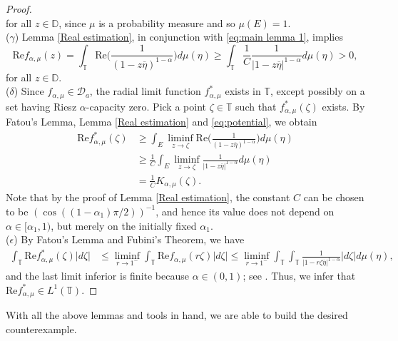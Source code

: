 \documentclass[12pt]{amsart}
\theoremstyle{definition}\newtheorem{remark}[theorem]{Remark}
\theoremstyle{definition}\newtheorem{example}[theorem]{Example}
\theoremstyle{definition}\newtheorem{definition}{Definition}
\numberwithin{equation}{section}
\newcommand\cD{{\mathcal D}}
\newcommand\DD{{\mathbb D}}
\newcommand\TT{{\mathbb T}}
\begin{document}
\begin{proof}
\begin{equation*}
\end{equation*}
for all $z\in \DD$, since $\mu$ is a probability measure and so $\mu(E)=1$.\\[2pt]
\textup{($\gamma$)}  Lemma \ref{Real estimation}, in conjunction with \eqref{eq:main lemma 1}, implies
\begin{equation*}
  \mathrm{Re}f_{\alpha,\mu}(z)=\int_{\TT}\mathrm{Re}\Big(\frac{1}{(1-z\overline{\eta})^{1-\alpha}}\Big)d\mu(\eta)\geq\int_{\TT}\frac{1}{C}\frac{1}{|1-z\overline{\eta}|^{1-\alpha}}d\mu(\eta)> 0,  
\end{equation*}
for all $z\in \DD$.\\[2pt]
\textup{($\delta$)} Since $f_{\alpha,\mu}\in \cD_a$, the radial limit function $f^*_{\alpha,\mu}$ exists in $\TT$, except possibly on a set having Riesz $\alpha$-capacity zero. Pick a point $\zeta \in\TT$ such that $f^*_{\alpha,\mu}(\zeta)$ exists. By Fatou's Lemma, Lemma \ref{Real estimation} and \eqref{eq:potential}, we obtain
\begin{align*}
\textrm{Re}f^*_{\alpha,\mu}(\zeta)&\geq 
\int_E\liminf_{z\rightarrow \zeta}\textrm{Re}\Big(\frac{1}{(1-z\overline{\eta})^{1-\alpha}}\Big)d\mu(\eta)\\
&\geq \frac{1}{C}\int_{E}\liminf_{z\rightarrow\zeta}\frac{1}{|1-z\overline{\eta}|^{1-\alpha}}d\mu(\eta)\\
&=\frac{1}{C}K_{\alpha,\mu}(\zeta).
\end{align*}
Note that by the proof of Lemma \ref{Real estimation}, the constant $C$ can be chosen to be $(\cos((1-\alpha_1)\pi/2))^{-1}$, and hence its value does not depend on $\alpha\in[\alpha_1,1)$, but merely on the initially fixed $\alpha_1$.\\[2pt]
\textup{($\epsilon$)} By Fatou's Lemma and Fubini's Theorem, we have
\begin{align*}
\int_{\TT}\textrm{Re}f^*_{\alpha,\mu}(\zeta)|d\zeta|&\leq \liminf_{r\rightarrow1^-} \int_{\TT}\textrm{Re}f_{\alpha,\mu}(r\zeta)|d\zeta|
\leq  \liminf_{r\rightarrow1^-} \int_{\TT}\int_{\TT}\frac{1}{|1-r\zeta\overline{\eta}|^{1-\alpha}}|d\zeta|d\mu(\eta),
\end{align*}
and the last limit inferior is finite because $\alpha\in (0,1)$; see \cite[Proposition 1.4.10]{Rudin}. Thus, we infer that $\textrm{Re}f^*_{\alpha,\mu}\in L^1(\TT)$.
\end{proof}

With all the above lemmas and tools in hand, we are able to build the desired counterexample.
\end{document}
